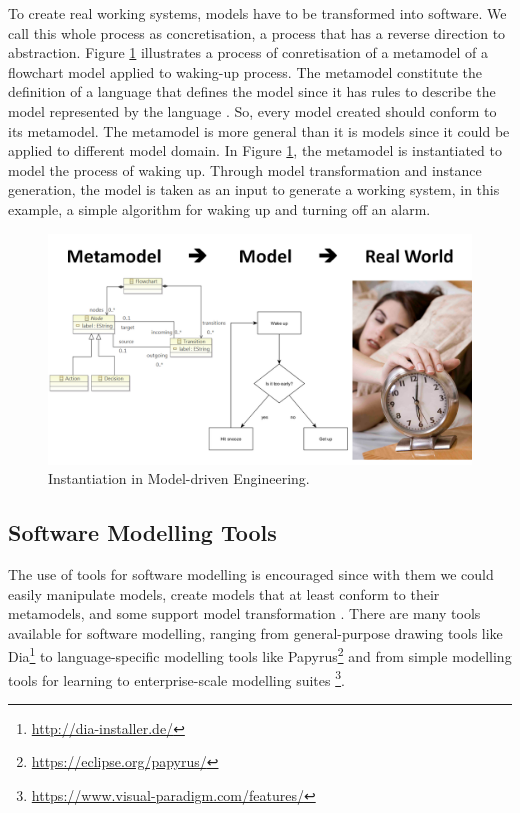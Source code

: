 \documentclass[12pt, a4paper]{report}
\begin{document}
To create real working systems, models have to be transformed into software. We call this whole process as concretisation, a process that has a reverse direction to abstraction. Figure \ref{concretisation} illustrates a process of conretisation of a metamodel of a flowchart model applied to waking-up process. The metamodel constitute the definition of a language that defines the model since it has rules to describe the model represented by the language \cite{brambilla2012model}. So, every model created should conform to its metamodel. The metamodel is more general than it is models since it could be applied to different model domain. In Figure \ref{concretisation}, the metamodel is instantiated to model the process of waking up. Through model transformation and instance generation, the model is taken as an input to generate a working system, in this example, a simple algorithm for waking up and turning off an alarm.   

\begin{figure}[ht]
\centering
\includegraphics[width=13cm]{concretisation}
\caption{Instantiation in Model-driven Engineering.}
\label{concretisation}
\end{figure}
   
\subsection{Software Modelling Tools}
The use of tools for software modelling is encouraged since with them we could easily manipulate models, create models that at least conform to their metamodels, and some support model transformation \cite{brambilla2012model}. There are many tools available for software modelling, ranging from general-purpose drawing tools like Dia\footnote{\url{http://dia-installer.de/}} to language-specific modelling tools like Papyrus\footnote{\url{https://eclipse.org/papyrus/}} and from  simple modelling tools for learning \cite{dranidis2015learning} to enterprise-scale modelling suites \footnote{\url{https://www.visual-paradigm.com/features/}}. 
\end{document}
